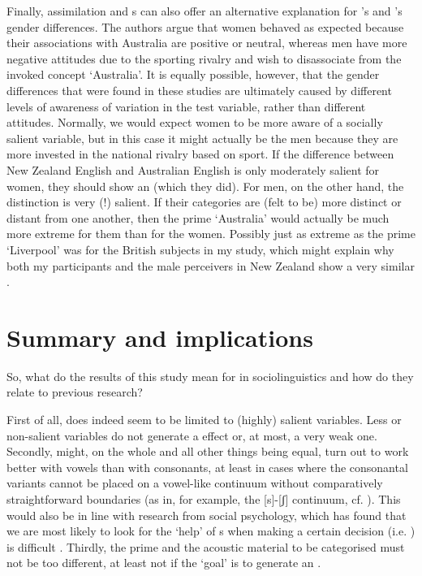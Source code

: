 Finally, assimilation and s can also offer an alternative explanation for \textcite{hayetal2006a}'s and \textcite{haydrager2010}'s gender differences.
The authors argue that women behaved as expected because their associations with Australia are positive or neutral, whereas men have more negative attitudes due to the sporting rivalry and wish to disassociate from the invoked concept `Australia'.
It is equally possible, however, that the gender differences that were found in these studies are ultimately caused by different levels of awareness of variation in the test variable, rather than different attitudes.
Normally, we would expect women to be more aware of a socially salient variable, but in this case it might actually be the men because they are more invested in the national rivalry based on sport.
If the difference between New Zealand English and Australian English is only moderately salient for women, they should show an  (which they did).
For men, on the other hand, the distinction is very (!) salient.
If their categories are (felt to be) more distinct or distant from one another, then the prime `Australia' would actually be much more extreme for them than for the women.
Possibly just as extreme as the prime `Liverpool' was for the British subjects in my study, which might explain why both my participants and the male perceivers in New Zealand show a very similar .

	\section{Summary and implications}

So, what do the results of this study mean for   in sociolinguistics and how do they relate to previous research?

First of all,  does indeed seem to be limited to (highly) salient variables.
Less or non-salient variables do not generate a  effect or, at most, a very weak one.
Secondly,  might, on the whole and all other things being equal, turn out to work better with vowels than with consonants, at least in cases where the consonantal variants cannot be placed on a vowel-like continuum without comparatively straightforward boundaries (as in, for example, the [s]-[ʃ] continuum, cf. \citealt{strand1999}).
This would also be in line with research from social psychology, which has found that we are most likely to look for the `help' of s when making a certain decision (i.e. ) is difficult \parencite[cf.][28]{petersensix2008}.
Thirdly, the prime and the acoustic material to be categorised must not be too different, at least not if the `goal' is to generate an .

